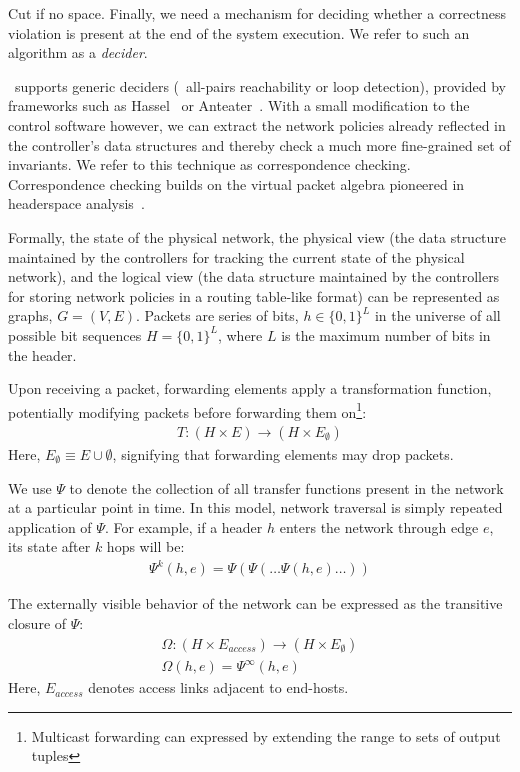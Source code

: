 \num{Cut if no space.}
Finally, we need a mechanism for deciding
whether a correctness violation is present at the end of the system execution.
We refer to such an algorithm as a {\em decider}.

\Simulator~supports generic deciders (\eg~all-pairs reachability or loop detection),
provided by frameworks such as Hassel~\cite{hsa,hsa_realtime} or
Anteater~\cite{anteater,khurshid2012veriflow}.
With a small modification to the control software however, we can
extract the network policies already reflected in the
controller's data structures and thereby check a much more fine-grained set of invariants.
We refer to this technique as correspondence checking. Correspondence checking
builds on the virtual packet algebra
pioneered in headerspace analysis~\cite{hsa}.

Formally, the state of the physical network, the physical view (the
data structure maintained by the controllers for tracking the current state of the physical
network), and the
logical view (the data structure maintained by the controllers for storing
network policies in a routing table-like format) can be represented as graphs,
$G = (V, E)$. Packets are series of bits, $h \in \{0,1\}^L$ in the universe
of all possible bit sequences $H = \{0,1\}^L$,
where $L$ is the maximum number of bits in the header.

Upon receiving a packet,
forwarding elements apply a transformation function, potentially modifying
packets before forwarding them on\footnote{Multicast forwarding can expressed
by extending the range to sets of output tuples}:
\begin{align*}
T: (H \times E) \rightarrow (H \times E_{\emptyset})
\end{align*}
Here, $E_{\emptyset} \equiv E \cup \emptyset$, signifying that forwarding elements
may drop packets.

We use $\Psi$ to denote the collection of all transfer functions present in
the network at a particular point in time. In this model, network traversal is
simply repeated application of $\Psi$.
For example, if a header $h$ enters the network through edge
$e$, its state after $k$ hops will be:
\begin{align*}
\Psi^k(h,e) = \Psi(\Psi(\dots \Psi(h,e)\dots))
\end{align*}

The externally visible behavior of the network can be expressed as the
transitive closure of $\Psi$:
\begin{align*}
\Omega: (H \times E_{access}) \rightarrow (H \times E_{\emptyset}) \\
\Omega(h,e) = \Psi^{\infty}(h,e)
\end{align*}
Here, $E_{access}$ denotes access links adjacent to end-hosts.

